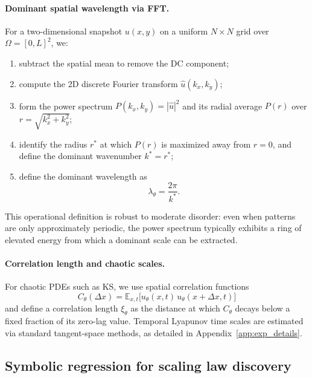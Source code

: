 \documentclass{article}
\theoremstyle{plain}
\theoremstyle{definition}
\theoremstyle{remark}
\newcommand{\E}{\mathbb{E}}
\begin{document}
\paragraph{Dominant spatial wavelength via FFT.}
For a two-dimensional snapshot $u(x,y)$ on a uniform $N\times N$ grid over $\Omega=[0,L]^2$, we:
\begin{enumerate}
    \item subtract the spatial mean to remove the DC component;
    \item compute the 2D discrete Fourier transform $\hat{u}(k_x,k_y)$;
    \item form the power spectrum $P(k_x,k_y)=|\hat{u}|^2$ and its radial average $P(r)$ over $r=\sqrt{k_x^2+k_y^2}$;
    \item identify the radius $r^*$ at which $P(r)$ is maximized away from $r=0$, and define the dominant wavenumber $k^* = r^*$;
    \item define the dominant wavelength as
    \begin{equation}
        \lambda_\theta = \frac{2\pi}{k^*}.
    \end{equation}
\end{enumerate}
This operational definition is robust to moderate disorder: even when patterns are only approximately periodic, the power spectrum typically exhibits a ring of elevated energy from which a dominant scale can be extracted.

\paragraph{Correlation length and chaotic scales.}
For chaotic PDEs such as KS, we use spatial correlation functions
\begin{equation}
    C_\theta(\Delta x) = \E_{x,t}\bigl[ u_\theta(x,t)\,u_\theta(x+\Delta x,t)\bigr]
\end{equation}
and define a correlation length $\xi_\theta$ as the distance at which $C_\theta$ decays below a fixed fraction of its zero-lag value. Temporal Lyapunov time scales are estimated via standard tangent-space methods, as detailed in Appendix~\ref{app:exp_details}.

\subsection{Symbolic regression for scaling law discovery}
\end{document}

